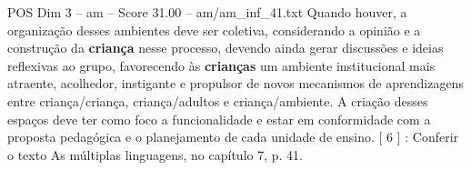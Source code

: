 \begin{textsample}{POS Dim 3 – am – Score 31.00 – am/am\_inf\_41.txt}
Quando houver, a organização desses ambientes deve ser coletiva, considerando a opinião e a construção da \textbf{criança} nesse processo, devendo ainda gerar discussões e ideias reflexivas ao grupo, favorecendo às \textbf{crianças} um ambiente institucional mais atraente, acolhedor, instigante e propulsor de novos mecanismos de aprendizagens entre criança/criança, criança/adultos e criança/ambiente.
A criação desses espaços deve ter como foco a funcionalidade e estar em conformidade com a proposta pedagógica e o planejamento de cada unidade de ensino. [ 6 ] : Conferir o texto As múltiplas linguagens, no capítulo 7, p. 41.

\end{textsample}
